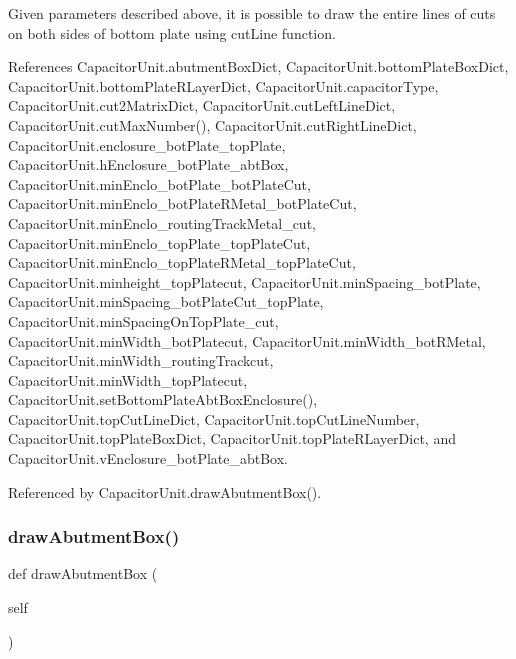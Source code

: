 Given parameters described above, it is possible to draw the entire lines of cuts on both sides of bottom plate using {\ttfamily cut\+Line} function. 

References Capacitor\+Unit.\+abutment\+Box\+Dict, Capacitor\+Unit.\+bottom\+Plate\+Box\+Dict, Capacitor\+Unit.\+bottom\+Plate\+R\+Layer\+Dict, Capacitor\+Unit.\+capacitor\+Type, Capacitor\+Unit.\+cut2\+Matrix\+Dict, Capacitor\+Unit.\+cut\+Left\+Line\+Dict, Capacitor\+Unit.\+cut\+Max\+Number(), Capacitor\+Unit.\+cut\+Right\+Line\+Dict, Capacitor\+Unit.\+enclosure\+\_\+bot\+Plate\+\_\+top\+Plate, Capacitor\+Unit.\+h\+Enclosure\+\_\+bot\+Plate\+\_\+abt\+Box, Capacitor\+Unit.\+min\+Enclo\+\_\+bot\+Plate\+\_\+bot\+Plate\+Cut, Capacitor\+Unit.\+min\+Enclo\+\_\+bot\+Plate\+R\+Metal\+\_\+bot\+Plate\+Cut, Capacitor\+Unit.\+min\+Enclo\+\_\+routing\+Track\+Metal\+\_\+cut, Capacitor\+Unit.\+min\+Enclo\+\_\+top\+Plate\+\_\+top\+Plate\+Cut, Capacitor\+Unit.\+min\+Enclo\+\_\+top\+Plate\+R\+Metal\+\_\+top\+Plate\+Cut, Capacitor\+Unit.\+minheight\+\_\+top\+Platecut, Capacitor\+Unit.\+min\+Spacing\+\_\+bot\+Plate, Capacitor\+Unit.\+min\+Spacing\+\_\+bot\+Plate\+Cut\+\_\+top\+Plate, Capacitor\+Unit.\+min\+Spacing\+On\+Top\+Plate\+\_\+cut, Capacitor\+Unit.\+min\+Width\+\_\+bot\+Platecut, Capacitor\+Unit.\+min\+Width\+\_\+bot\+R\+Metal, Capacitor\+Unit.\+min\+Width\+\_\+routing\+Trackcut, Capacitor\+Unit.\+min\+Width\+\_\+top\+Platecut, Capacitor\+Unit.\+set\+Bottom\+Plate\+Abt\+Box\+Enclosure(), Capacitor\+Unit.\+top\+Cut\+Line\+Dict, Capacitor\+Unit.\+top\+Cut\+Line\+Number, Capacitor\+Unit.\+top\+Plate\+Box\+Dict, Capacitor\+Unit.\+top\+Plate\+R\+Layer\+Dict, and Capacitor\+Unit.\+v\+Enclosure\+\_\+bot\+Plate\+\_\+abt\+Box.



Referenced by Capacitor\+Unit.\+draw\+Abutment\+Box().

\mbox{\label{classpython_1_1capacitorunit_1_1CapacitorUnit_ad3ea453f04d9ec2c38eab0ee8af8047d}} 
\subsubsection{\texorpdfstring{draw\+Abutment\+Box()}{drawAbutmentBox()}}
{\footnotesize\ttfamily def draw\+Abutment\+Box (\begin{DoxyParamCaption}\item[{}]{self }\end{DoxyParamCaption})}



